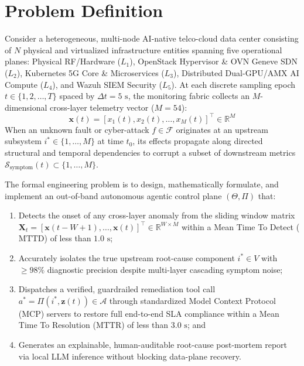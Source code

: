 \section{Problem Definition}
Consider a heterogeneous, multi-node AI-native telco-cloud data center consisting of $N$ physical and virtualized infrastructure entities spanning five operational planes: Physical RF/Hardware ($L_1$), OpenStack Hypervisor \& OVN Geneve SDN ($L_2$), Kubernetes 5G Core \& Microservices ($L_3$), Distributed Dual-GPU/AMX AI Compute ($L_4$), and Wazuh SIEM Security ($L_5$). At each discrete sampling epoch $t \in \{1, 2, \dots, T\}$ spaced by $\Delta t = 5\text{ s}$, the monitoring fabric collects an $M$-dimensional cross-layer telemetry vector ($M=54$):
\begin{equation}
\mathbf{x}(t) = \left[ x_1(t), x_2(t), \dots, x_M(t) \right]^\top \in \mathbb{R}^M
\end{equation}
When an unknown fault or cyber-attack $f \in \mathcal{F}$ originates at an upstream subsystem $i^* \in \{1, \dots, M\}$ at time $t_0$, its effects propagate along directed structural and temporal dependencies to corrupt a subset of downstream metrics $\mathcal{S}_{\text{symptom}}(t) \subset \{1, \dots, M\}$.

The formal engineering problem is to design, mathematically formulate, and implement an out-of-band autonomous agentic control plane $(\Theta, \Pi)$ that:
\begin{enumerate}
    \item Detects the onset of any cross-layer anomaly from the sliding window matrix $\mathbf{X}_t = [\mathbf{x}(t-W+1), \dots, \mathbf{x}(t)]^\top \in \mathbb{R}^{W \times M}$ within a Mean Time To Detect ($\text{MTTD}$) of less than $1.0\text{ s}$;
    \item Accurately isolates the true upstream root-cause component $i^* \in V$ with $\ge 98\%$ diagnostic precision despite multi-layer cascading symptom noise;
    \item Dispatches a verified, guardrailed remediation tool call $a^* = \Pi(i^*, \mathbf{z}(t)) \in \mathcal{A}$ through standardized Model Context Protocol (MCP) servers to restore full end-to-end SLA compliance within a Mean Time To Resolution ($\text{MTTR}$) of less than $3.0\text{ s}$; and
    \item Generates an explainable, human-auditable root-cause post-mortem report via local LLM inference without blocking data-plane recovery.
\end{enumerate}

